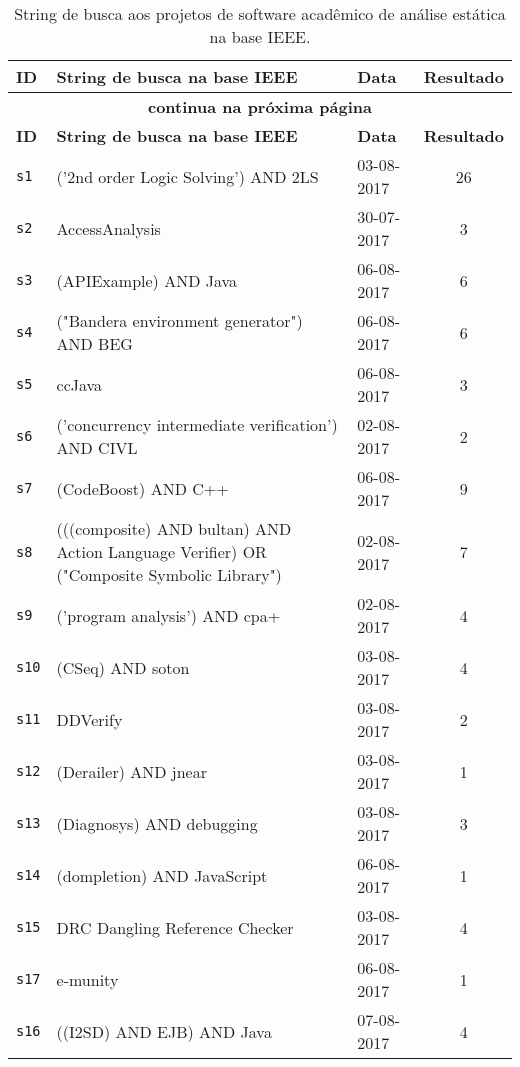 \begin{longtable}{| l | p{13cm} | l | c |}
  \caption{String de busca aos projetos de software acadêmico de análise estática na base IEEE.}
  \label{search-strings-table-ieee} \\
  \hline
  \endfirsthead
  \hline
  \textbf{ID} & \textbf{String de busca na base IEEE} & \textbf{Data} & \textbf{Resultado} \\
  \hline
  \endhead
  \multicolumn{4}{c}{\textbf{continua na próxima página}} \\
  \hhline{----} \endfoot
  \endlastfoot
  \textbf{ID} & \textbf{String de busca na base IEEE} & \textbf{Data} & \textbf{Resultado} \\
  \hline
\texttt{s1} & ('2nd order Logic Solving') AND 2LS & 03-08-2017 & 26 \\
    \hline
\texttt{s2} & AccessAnalysis & 30-07-2017 & 3 \\
    \hline
\texttt{s3} & (APIExample) AND Java & 06-08-2017 & 6 \\
    \hline
\texttt{s4} & ("Bandera environment generator") AND BEG & 06-08-2017 & 6 \\
    \hline
\texttt{s5} & ccJava & 06-08-2017 & 3 \\
    \hline
\texttt{s6} & ('concurrency intermediate verification') AND CIVL & 02-08-2017 & 2 \\
    \hline
\texttt{s7} & (CodeBoost) AND C++ & 06-08-2017 & 9 \\
    \hline
\texttt{s8} & (((composite) AND bultan) AND Action Language Verifier) OR ("Composite Symbolic Library") & 02-08-2017 & 7 \\
    \hline
\texttt{s9} & ('program analysis') AND cpa+ & 02-08-2017 & 4 \\
    \hline
\texttt{s10} & (CSeq) AND soton & 03-08-2017 & 4 \\
    \hline
\texttt{s11} & DDVerify & 03-08-2017 & 2 \\
    \hline
\texttt{s12} & (Derailer) AND jnear & 03-08-2017 & 1 \\
    \hline
\texttt{s13} & (Diagnosys) AND debugging & 03-08-2017 & 3 \\
    \hline
\texttt{s14} & (dompletion) AND JavaScript & 06-08-2017 & 1 \\
    \hline
\texttt{s15} & DRC Dangling Reference Checker & 03-08-2017 & 4 \\
    \hline
\texttt{s17} & e-munity & 06-08-2017 & 1 \\
    \hline
\texttt{s16} & ((I2SD) AND EJB) AND Java & 07-08-2017 & 4 \\

\end{longtable}
